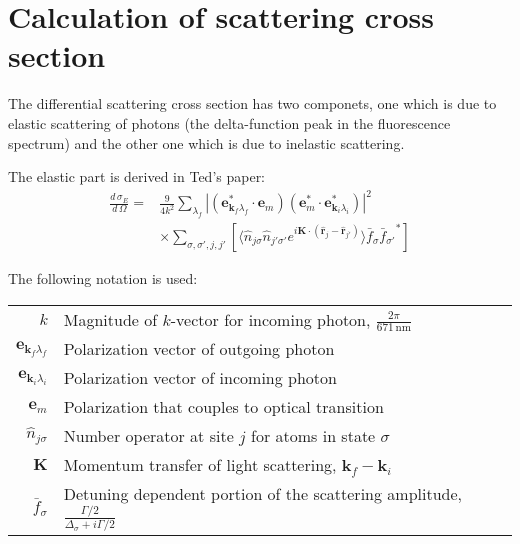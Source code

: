 \documentclass[11pt,letter]{article}
\newcommand{\bv}[1]{\ensuremath{\mathbf{#1}}}
\newcommand{\dsig}[1]{\ensuremath{ \frac{ d\,\sigma_{#1} }{d\,\Omega} }}
\begin{document}
\section{ Calculation of scattering cross section}

The differential scattering cross section has two componets, one which is due
to elastic scattering of photons (the delta-function peak in the fluorescence
spectrum) and the other one which is due to inelastic scattering.   

The elastic part is derived in Ted's paper:
\begin{equation}
\begin{split}
\dsig{E} =&   \frac{9}{4k^{2}} 
              \sum_{\lambda_{f}}  | (\bv{e}_{\bv{k}_{f} \lambda_{f}}^{*} \cdot \bv{e}_{m} ) 
                                   (\bv{e}_{m}^{*} \cdot \bv{e}_{\bv{k}_{i} \lambda_{i}}^{*}  ) 
                                 |^{2} \\
          &   \times \sum_{ \sigma,\sigma', j, j' } [ \langle \hat{n}_{j\sigma}\hat{n}_{j'\sigma'}
              e^{ i \bv{K} \cdot ( \hat{\bv{r}}_{j} - \hat{\bv{r}}_{j'} )  } \rangle 
              \bar{f}_{\sigma} {\bar{f}_{\sigma'}}^{*} ] 
\end{split}
\end{equation}

The following notation is used: 

\begin{center}
  \begin{tabular}{ r  l  }
    $k$ & Magnitude of $k$-vector for incoming photon,  $\frac{2\pi}{671\,\mathrm{nm}}$   \\ 
    $\bv{e}_{\bv{k}_{f} \lambda_{f}}$  & Polarization vector of outgoing photon  \\ 
    $\bv{e}_{\bv{k}_{i} \lambda_{i}}$  & Polarization vector of incoming photon  \\ 
    $\bv{e}_{m}$  & Polarization that couples to optical transition  \\ 
    $\hat{n}_{j\sigma}$ & Number operator at site $j$ for atoms in state $\sigma$   \\ 
    $\bv{K}$ &  Momentum transfer of light scattering, $\bv{k}_{f} - \bv{k}_{i}$  \\ 
    $\bar{f}_{\sigma}$ & Detuning dependent portion of the scattering amplitude, $\frac{\Gamma/2}{\Delta_{\sigma} + i \Gamma/2 }$ \\ 
  \end{tabular}
\end{center}
\end{document}
